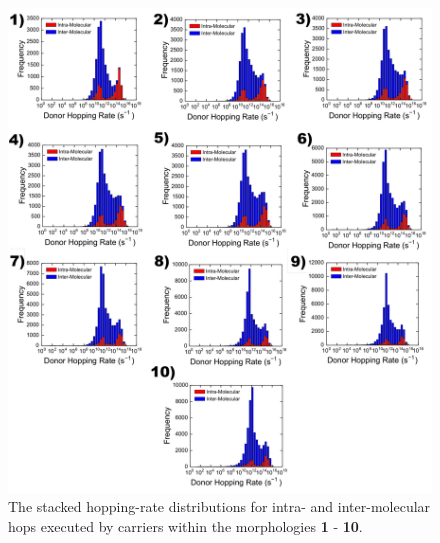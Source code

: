 \documentclass[12pt]{article}
\begin{document}
\begin{figure}[h!]\centering
	\includegraphics[width=\textwidth]{Figures/HoppingRates.pdf}
    \caption{The stacked hopping-rate distributions for intra- and inter-molecular hops executed by carriers within the morphologies \textbf{1} - \textbf{10}.}
	\label{fig:HoppingRateMixed}
\end{figure}

\clearpage




\end{document}
